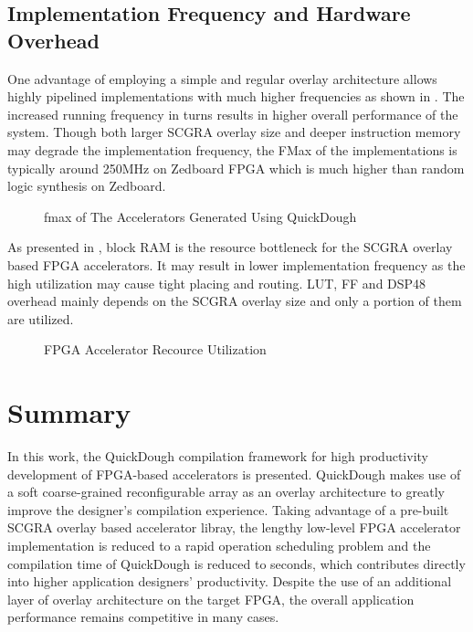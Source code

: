 \subsection{Implementation Frequency and Hardware Overhead} \label{subsec:acc-impl}
One advantage of employing a simple and regular overlay architecture allows highly 
pipelined implementations with much higher frequencies as shown in . 
The increased running frequency in turns results in higher overall 
performance of the system. Though both larger SCGRA overlay size 
and deeper instruction memory may degrade the implementation frequency, the FMax of the
implementations is typically around 250MHz on Zedboard FPGA which is much higher than random logic
synthesis on Zedboard.

\begin{figure}[htb]
\caption{fmax of The Accelerators Generated Using QuickDough}
\label{fig:impl-freq}
\end{figure}

As presented in , block RAM is the resource bottleneck for the SCGRA overlay
based FPGA accelerators. It may result in lower implementation frequency as the high utilization may
cause tight placing and routing. LUT, FF and DSP48 overhead mainly depends on the SCGRA overlay size and only a
portion of them are utilized.

\begin{figure}[htb]
\vspace{1em}
\caption{FPGA Accelerator Recource Utilization}
\label{fig:hw-overhead}
\end{figure}

\section{Summary}
In this work, the QuickDough compilation framework for high productivity development of FPGA-based accelerators is presented. QuickDough makes use of a soft coarse-grained reconfigurable array as an overlay architecture to greatly improve the designer's compilation experience. Taking advantage of a pre-built SCGRA overlay based accelerator libray, the lengthy low-level FPGA accelerator implementation is reduced to a rapid operation scheduling problem and the compilation time of QuickDough is reduced to seconds, which contributes directly into higher application designers' productivity. Despite the use of an additional layer of overlay architecture on the target FPGA, the overall application performance remains competitive in many cases.
